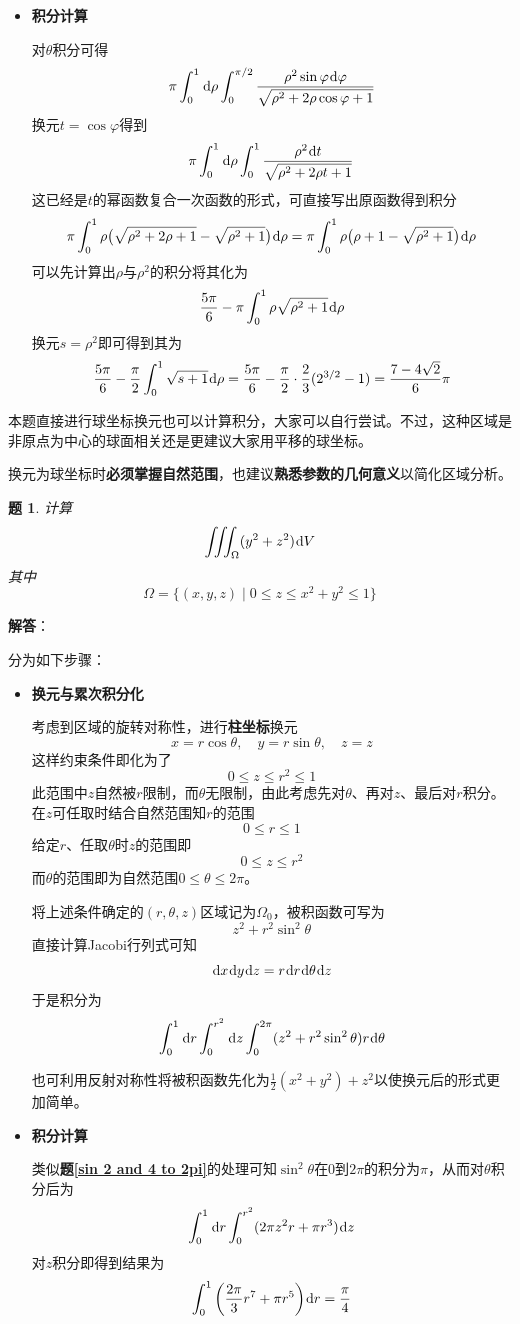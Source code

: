\documentclass[a4paper,UTF8,fontset=windows,AutoFakeBold]{ctexart}
\newcommand*{\dr}{\hspace{0.07em}\mathrm{d}}
\newcommand*{\note}{\noindent *}
\theoremstyle{ex}
\newtheorem{exercise}{题}
\newcommand{\exref}[1]{\textbf{题\;\ref{#1}\;}}
\newcommand{\sol}[1]{{\vspace{5pt}\kaishu\noindent\textbf{解答}：\vspace{-3pt}
\begin{compactitem}
    \item[] #1
\end{compactitem}
}}
\begin{document}
\begin{framed}
{\begin{itemize}
        \item \textbf{积分计算}
        
        对$\theta$积分可得
        $$\pi\int_0^1\dr\rho\int_0^{\pi/2}\frac{\rho^2\sin\varphi\dr\varphi}{\sqrt{\rho^2+2\rho\cos\varphi+1}}$$
        换元$t=\cos\varphi$得到
        $$\pi\int_0^1\dr\rho\int_0^1\frac{\rho^2\dr t}{\sqrt{\rho^2+2\rho t+1}}$$
        这已经是$t$的幂函数复合一次函数的形式，可直接写出原函数得到积分
        $$\pi\int_0^1\rho\big(\sqrt{\rho^2+2\rho+1}-\sqrt{\rho^2+1}\big)\dr\rho=\pi\int_0^1\rho\big(\rho+1-\sqrt{\rho^2+1}\big)\dr\rho$$
        可以先计算出$\rho$与$\rho^2$的积分将其化为
        $$\frac{5\pi}{6}-\pi\int_0^1\rho\sqrt{\rho^2+1}\dr\rho$$
        换元$s=\rho^2$即可得到其为
        $$\frac{5\pi}{6}-\frac{\pi}{2}\int_0^1\sqrt{s+1}\dr\rho=\frac{5\pi}{6}-\frac{\pi}{2}\cdot\frac{2}{3}(2^{3/2}-1)=\frac{7-4\sqrt2}{6}\pi$$
    \end{itemize}

    \note 本题直接进行球坐标换元也可以计算积分，大家可以自行尝试。不过，这种区域是非原点为中心的球面相关还是更建议大家用平移的球坐标。
}
\end{framed}

\note 换元为球坐标时\textbf{必须掌握自然范围}，也建议\textbf{熟悉参数的几何意义}以简化区域分析。

\begin{framed}
\begin{exercise}
    计算
    $$\iiint_\Omega(y^2+z^2)\dr V$$
    其中
    $$\Omega=\{(x,y,z)\mid0\le z\le x^2+y^2\le1\}$$
\end{exercise}
\sol{
    分为如下步骤：
    \begin{itemize}
        \item \textbf{换元与累次积分化}
        
        考虑到区域的旋转对称性，进行\textbf{柱坐标}换元
        $$x=r\cos\theta,\quad y=r\sin\theta,\quad z=z$$
        这样约束条件即化为了
        $$0\le z\le r^2\le1$$
        此范围中$z$自然被$r$限制，而$\theta$无限制，由此考虑先对$\theta$、再对$z$、最后对$r$积分。在$z$可任取时结合自然范围知$r$的范围
        $$0\le r\le1$$
        给定$r$、任取$\theta$时$z$的范围即
        $$0\le z\le r^2$$
        而$\theta$的范围即为自然范围$0\le\theta\le2\pi$。

        将上述条件确定的$(r,\theta,z)$区域记为$\Omega_0$，被积函数可写为
        $$z^2+r^2\sin^2\theta$$
        直接计算Jacobi行列式可知
        $$\dr x\dr y\dr z=r\dr r\dr\theta\dr z$$
        于是积分为
        $$\int_0^1\dr r\int_0^{r^2}\dr z\int_0^{2\pi}(z^2+r^2\sin^2\theta)r\dr\theta$$

        \note 也可利用反射对称性将被积函数先化为$\frac{1}{2}(x^2+y^2)+z^2$以使换元后的形式更加简单。

        \item \textbf{积分计算}
        
        类似\exref{sin 2 and 4 to 2pi}的处理可知$\sin^2\theta$在0到$2\pi$的积分为$\pi$，从而对$\theta$积分后为
        $$\int_0^1\dr r\int_0^{r^2}(2\pi z^2r+\pi r^3)\dr z$$
        对$z$积分即得到结果为
        $$\int_0^1\bigg(\frac{2\pi}{3}r^7+\pi r^5\bigg)\dr r=\frac{\pi}{4}$$
    \end{itemize}
}
\end{framed}
\end{document}
